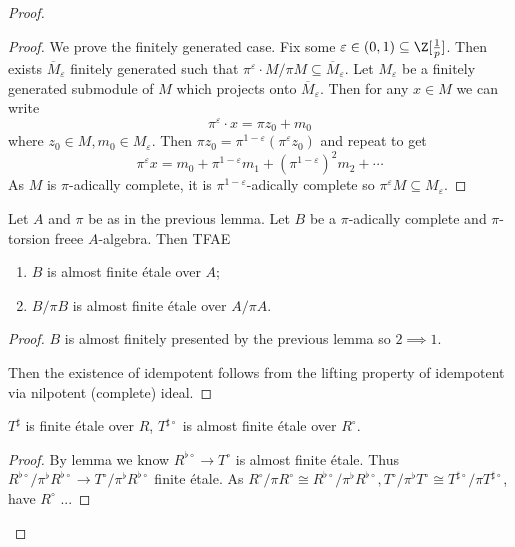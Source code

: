 \documentclass[a4paper]{article}
\newcommand{\tilt}{\flat} %
\begin{document}
\begin{proof}
  \begin{proof}
    We prove the finitely generated case. Fix some \(\varepsilon \in (0, 1) \subseteq \Z[\frac{1}{p}]\). Then exists \(\overline M_{\varepsilon}\) finitely generated such that \(\pi^\varepsilon \cdot M/\pi M \subseteq \overline M_\varepsilon\). Let \(M_\varepsilon\) be a finitely generated submodule of \(M\) which projects onto \(\overline M_\varepsilon\). Then for any \(x \in M\) we can write
    \[
      \pi^\varepsilon \cdot x = \pi z_0 + m_0
    \]
    where \(z_0 \in M, m_0 \in M_\varepsilon\). Then \(\pi z_0 = \pi^{1 - \varepsilon}(\pi^\varepsilon z_0)\) and repeat to get
    \[
      \pi^\varepsilon x = m_0 + \pi^{1 - \varepsilon} m_1 + (\pi^{1 - \varepsilon})^2 m_2 + \cdots
    \]
    As \(M\) is \(\pi\)-adically complete, it is \(\pi^{1 - \varepsilon}\)-adically complete so \(\pi^\varepsilon M \subseteq M_\varepsilon\).
  \end{proof}

  \begin{lemma}
    Let \(A\) and \(\pi\) be as in the previous lemma. Let \(B\) be a \(\pi\)-adically complete and \(\pi\)-torsion freee \(A\)-algebra. Then TFAE
    \begin{enumerate}
    \item \(B\) is almost finite étale over \(A\);
    \item \(B/\pi B\) is almost finite étale over \(A/\pi A\).
    \end{enumerate}
  \end{lemma}

  \begin{proof}
    \(B\) is almost finitely presented by the previous lemma so \(2 \implies 1\).

    Then the existence of idempotent follows from the lifting property of idempotent via nilpotent (complete) ideal.
  \end{proof}

  \begin{lemma}
    \(T^\sharp\) is finite étale over \(R\), \(T^{\sharp \circ}\) is  almost finite étale over \(R^\circ\).
  \end{lemma}

  \begin{proof}
    By lemma we know \(R^{\tilt \circ} \to T^\circ\) is almost finite étale. Thus \(R^{\tilt \circ}/\pi^\tilt R^{\tilt \circ} \to T^\circ/\pi^\tilt R^{\tilt \circ}\) finite étale. As \(R^\circ/\pi R^\circ \cong R^{\tilt \circ}/\pi^\tilt R^{\tilt \circ}, T^\circ/\pi^\tilt T^\circ \cong T^{\sharp \circ}/\pi T^{\sharp \circ}\), have \(R^\circ\) ...


\end{proof}
\end{proof}
\end{document}
